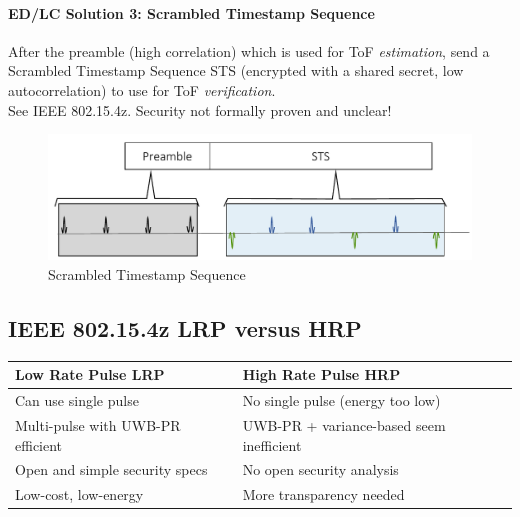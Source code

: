 \paragraph{ED/LC Solution 3: Scrambled Timestamp Sequence}

After the preamble (high correlation) which is used for ToF \textit{estimation},
send a Scrambled Timestamp Sequence STS (encrypted with a shared secret, low autocorrelation) to use for ToF \textit{verification}.
\\
See IEEE 802.15.4z.
Security not formally proven and unclear!

\begin{figure}[h]
	\centering
	\includegraphics[scale=0.35]{images/5-scrambled-timestamp.png}
	\caption{Scrambled Timestamp Sequence}%
	\label{fig:scrambled-timestamp}
\end{figure}

\subsection{IEEE 802.15.4z LRP versus HRP}
\begin{table}[h]
	\centering
	\begin{tabular}{ll}
		\hline
		Low Rate Pulse LRP                & High Rate Pulse HRP                      \\ \hline
		Can use single pulse              & No single pulse (energy too low)         \\
		Multi-pulse with UWB-PR efficient & UWB-PR + variance-based seem inefficient \\
		Open  and simple security specs   & No open security analysis                \\
		Low-cost, low-energy              & More transparency needed                 \\ \hline
	\end{tabular}
\end{table}


